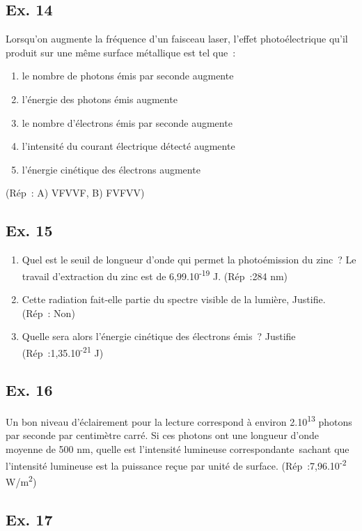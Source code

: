 {{{\subsection{Ex. 14}

Lorsqu'on augmente la fréquence d'un faisceau laser, l'effet
  photoélectrique qu'il produit sur une même surface métallique est tel
  que~:
\begin{enumerate}
  \item    le nombre de photons émis par seconde augmente
  \item    l'énergie des photons émis augmente
  \item le nombre d'électrons émis par seconde augmente
  \item    l'intensité du courant électrique détecté augmente
  \item    l'énergie cinétique des électrons augmente
\end{enumerate}
(Rép~: A) VFVVF, B) FVFVV)

\subsection{Ex. 15}

\begin{enumerate}
\item  Quel est le seuil de longueur d'onde qui permet la photoémission du
  zinc~? Le travail d'extraction du zinc est de
  6,99.10\textsuperscript{-19} J. (Rép~:284 nm)
\item  Cette radiation fait-elle partie du spectre visible de la lumière,
  Justifie. (Rép~: Non)
\item  Quelle sera alors l'énergie cinétique des électrons émis~? Justifie
  (Rép~:1,35.10\textsuperscript{-21} J)
\end{enumerate}

\subsection{Ex. 16}

Un bon niveau d'éclairement pour la lecture correspond à environ
2.10\textsuperscript{13} photons par seconde par centimètre carré. Si
ces photons ont une longueur d'onde moyenne de 500 nm, quelle est
l'intensité lumineuse correspondante~sachant que l'intensité lumineuse
est la puissance reçue par unité de surface.
(Rép~:7,96.10\textsuperscript{-2} W/m\textsuperscript{2})

\subsection{Ex. 17}

}}}
